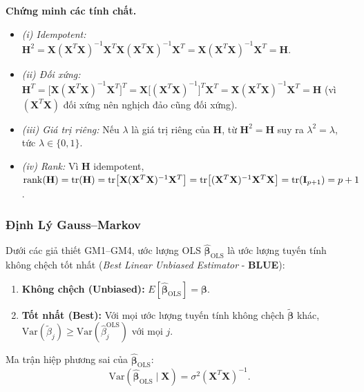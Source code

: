 \textbf{Chứng minh các tính chất.}
\begin{itemize}
    \item \textit{(i) Idempotent:}
    $\mathbf{H}^2 = \mathbf{X}(\mathbf{X}^T\mathbf{X})^{-1}\mathbf{X}^T
                   \mathbf{X}(\mathbf{X}^T\mathbf{X})^{-1}\mathbf{X}^T
               = \mathbf{X}(\mathbf{X}^T\mathbf{X})^{-1}\mathbf{X}^T = \mathbf{H}$.
    \item \textit{(ii) Đối xứng:}
    $\mathbf{H}^T = \bigl[\mathbf{X}(\mathbf{X}^T\mathbf{X})^{-1}\mathbf{X}^T\bigr]^T
               = \mathbf{X}\bigl[(\mathbf{X}^T\mathbf{X})^{-1}\bigr]^T\mathbf{X}^T
               = \mathbf{X}(\mathbf{X}^T\mathbf{X})^{-1}\mathbf{X}^T = \mathbf{H}$
    (vì $(\mathbf{X}^T\mathbf{X})$ đối xứng nên nghịch đảo cũng đối xứng).
    \item \textit{(iii) Giá trị riêng:} Nếu $\lambda$ là giá trị riêng của $\mathbf{H}$,
    từ $\mathbf{H}^2 = \mathbf{H}$ suy ra $\lambda^2 = \lambda$, tức $\lambda \in \{0, 1\}$.
    \item \textit{(iv) Rank:} Vì $\mathbf{H}$ idempotent,
    $\operatorname{rank}(\mathbf{H}) = \mathrm{tr}(\mathbf{H})
    = \mathrm{tr}\bigl[\mathbf{X}(\mathbf{X}^T\mathbf{X})^{-1}\mathbf{X}^T\bigr]
    = \mathrm{tr}\bigl[(\mathbf{X}^T\mathbf{X})^{-1}\mathbf{X}^T\mathbf{X}\bigr]
    = \mathrm{tr}(\mathbf{I}_{p+1}) = p+1$.
\end{itemize}

\subsubsection{Định Lý Gauss–Markov}

\begin{tcolorbox}[mycodebox, colback=blue!3!white, colframe=blue!40!black,
    title={\textbf{Định lý 1.2} - Gauss–Markov (BLUE)}]
Dưới các giả thiết GM1–GM4, ước lượng OLS
$\hat{\boldsymbol{\beta}}_{\mathrm{OLS}}$ là ước lượng tuyến tính không
chệch tốt nhất (\emph{Best Linear Unbiased Estimator} - \textbf{BLUE}):
\begin{enumerate}[label=(\roman*)]
    \item \textbf{Không chệch (Unbiased):}
          $E[\hat{\boldsymbol{\beta}}_{\mathrm{OLS}}] = \boldsymbol{\beta}$.
    \item \textbf{Tốt nhất (Best):} Với mọi ước lượng tuyến tính không chệch
          $\tilde{\boldsymbol{\beta}}$ khác,
          $\mathrm{Var}(\tilde{\beta}_j) \geq \mathrm{Var}(\hat{\beta}_j^{\mathrm{OLS}})$
          với mọi $j$.
\end{enumerate}
Ma trận hiệp phương sai của $\hat{\boldsymbol{\beta}}_{\mathrm{OLS}}$:
\begin{equation}
    \mathrm{Var}(\hat{\boldsymbol{\beta}}_{\mathrm{OLS}} \mid \mathbf{X})
    = \sigma^2(\mathbf{X}^T\mathbf{X})^{-1}.
    \label{eq:var_beta}
\end{equation}
\end{tcolorbox}

